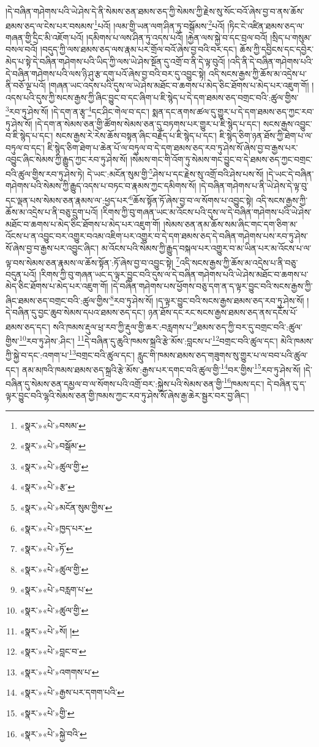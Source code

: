 །དེ་བཞིན་གཤེགས་པའི་ཡེ་ཤེས་དེ་ནི་སེམས་ཅན་ཐམས་ཅད་ཀྱི་སེམས་ཀྱི་རྗེས་སུ་སོང་བའོ་ཞེས་བྱ་བ་ནས་ཆོས་ཐམས་ཅད་ལ་ངེས་པར་བསམས་\footnote{«སྣར་»«པེ་»བསམ་}པའོ། །ལམ་གྱི་ཡན་ལག་ཤིན་ཏུ་བསྒོམས་\footnote{«སྣར་»«པེ་»བསྒོམ་}པའོ། །ཏིང་ངེ་འཛིན་ཐམས་ཅད་ལ་གཞན་གྱི་དྲིང་མི་འཇོག་པའོ། །དམིགས་པ་ལས་ཤིན་ཏུ་འདས་པའོ། །རྐྱེན་ལས་སྐྱེ་བ་དང་བྲལ་བའོ། །སྲིད་པ་གསུམ་བསལ་བའོ། །བདུད་ཀྱི་ལས་ཐམས་ཅད་ལས་རྣམ་པར་གྲོལ་བའོ་ཞེས་བྱ་བའི་བར་དང་། ཆོས་ཀྱི་དབྱིངས་དང་དབྱེར་མེད་པ་སྟེ་དེ་བཞིན་གཤེགས་པའི་ཡིད་ཀྱི་ལས་ཡེ་ཤེས་སྔོན་དུ་འགྲོ་བ་ནི་དེ་ལྟ་བུའོ། །འདི་ནི་དེ་བཞིན་གཤེགས་པའི་དེ་བཞིན་གཤེགས་པའི་ལས་ཉི་ཤུ་རྩ་དགུ་པའོ་ཞེས་བྱ་བའི་བར་དུ་འབྱུང་སྟེ། འདི་སངས་རྒྱས་ཀྱི་ཆོས་མ་འདྲེས་པ་ནི་བཅོ་ལྔ་པའོ། །གཞན་ཡང་འདས་པའི་དུས་ལ་ཡེ་ཤེས་མཐོང་བ་ཆགས་པ་མེད་ཅིང་ཐོགས་པ་མེད་པར་འཇུག་གོ། །འདས་པའི་དུས་ཀྱི་སངས་རྒྱས་ཀྱི་ཞིང་བྱུང་བ་དང་ཞིག་པ་ཇི་སྙེད་པ་དེ་དག་ཐམས་ཅད་བགྲང་བའི་:ཚུལ་གྱིས་\footnote{«སྣར་»«པེ་»ཚུལ་གྱི་}རབ་ཏུ་ཤེས་སོ། །དེ་དག་ན་རྩྭ་\footnote{«སྣར་»«པེ་»རྩ་}དང་ཤིང་གེལ་བ་དང་། སྨན་དང་ནགས་ཚལ་དུ་གྱུར་པ་དེ་དག་ཐམས་ཅད་ཀྱང་རབ་ཏུ་ཤེས་སོ། །དེ་དག་ན་སེམས་ཅན་གྱི་ཚོགས་སེམས་ཅན་དུ་བཏགས་པར་གྱུར་པ་ཇི་སྙེད་པ་དང་། སངས་རྒྱས་འབྱུང་བ་ཇི་སྙེད་པ་དང་། སངས་རྒྱས་རེ་རེས་ཆོས་བསྟན་ཞིང་བརྗོད་པ་ཇི་སྙེད་པ་དང་། ཇི་སྙེད་ཅིག་ཉན་ཐོས་ཀྱི་ཐེག་པ་ལ་བཏུལ་བ་དང་། ཇི་སྙེད་ཅིག་ཐེག་པ་ཆེན་པོ་ལ་བཏུལ་བ་དེ་དག་ཐམས་ཅད་རབ་ཏུ་ཤེས་སོ་ཞེས་བྱ་བ་རྒྱས་པར་འབྱུང་ཞིང་སེམས་ཀྱི་རྒྱུད་ཀྱང་རབ་ཏུ་ཤེས་སོ། །སེམས་གང་གི་འོག་ཏུ་སེམས་གང་བྱུང་བ་དེ་ཐམས་ཅད་ཀྱང་བགྲང་བའི་ཚུལ་གྱིས་རབ་ཏུ་ཤེས་ཏེ། དེ་ཡང་:མངོན་སུམ་གྱི་\footnote{«སྣར་»«པེ་»མངོན་སུམ་གྱིས་}ཤེས་པ་དང་རྗེས་སུ་འགྲོ་བའི་ཤེས་པས་སོ། །དེ་ཡང་དེ་བཞིན་གཤེགས་པའི་སེམས་ཀྱི་རྒྱུད་འདས་པ་བཏང་བ་རྣམས་ཀྱང་དམིགས་སོ། །དེ་བཞིན་གཤེགས་པ་ནི་ཡེ་ཤེས་དེ་ལྟ་བུ་དང་ལྡན་པས་སེམས་ཅན་རྣམས་ལ་:ཕྱད་པར་\footnote{«སྣར་»«པེ་»ཁྱད་པར་}ཆོས་སྟོན་ཏོ་ཞེས་བྱ་བ་ལ་སོགས་པ་འབྱུང་སྟེ། འདི་སངས་རྒྱས་ཀྱི་ཆོས་མ་འདྲེས་པ་ནི་བཅུ་དྲུག་པའོ། །རིགས་ཀྱི་བུ་གཞན་ཡང་མ་འོངས་པའི་དུས་ལ་དེ་བཞིན་གཤེགས་པའི་ཡེ་ཤེས་མཐོང་བ་ཆགས་པ་མེད་ཅིང་ཐོགས་པ་མེད་པར་འཇུག་གོ། །སེམས་ཅན་ནམ་ཆོས་སམ་ཞིང་གང་དག་ཅིག་མ་འོངས་པ་ན་འབྱུང་བར་འགྱུར་བའམ་འཇིག་པར་འགྱུར་བ་དེ་དག་ཐམས་ཅད་དེ་བཞིན་གཤེགས་པས་རབ་ཏུ་ཤེས་སོ་ཞེས་བྱ་བ་རྒྱས་པར་འབྱུང་ཞིང་། མ་འོངས་པའི་སེམས་ཀྱི་རྒྱུད་བསྐལ་པར་འགྱུར་བ་མ་ཡིན་པར་མ་འོངས་པ་ལ་ལྟ་བས་སེམས་ཅན་རྣམས་ལ་ཆོས་སྟོན་:ཏོ་ཞེས་བྱ་བ་འབྱུང་སྟེ། \footnote{«སྣར་»«པེ་»ཏོ་}འདི་སངས་རྒྱས་ཀྱི་ཆོས་མ་འདྲེས་པ་ནི་བཅུ་བདུན་པའོ། །རིགས་ཀྱི་བུ་གཞན་ཡང་ད་ལྟར་བྱུང་བའི་དུས་ལ་དེ་བཞིན་གཤེགས་པའི་ཡེ་ཤེས་མཐོང་བ་ཆགས་པ་མེད་ཅིང་ཐོགས་པ་མེད་པར་འཇུག་གོ། །དེ་བཞིན་གཤེགས་པས་ཕྱོགས་བཅུ་དག་ན་ད་ལྟར་བྱུང་བའི་སངས་རྒྱས་ཀྱི་ཞིང་ཐམས་ཅད་བགྲང་བའི་:ཚུལ་གྱིས་\footnote{«སྣར་»«པེ་»ཚུལ་གྱི་}རབ་ཏུ་ཤེས་སོ། །ད་ལྟར་བྱུང་བའི་སངས་རྒྱས་ཐམས་ཅད་རབ་ཏུ་ཤེས་སོ། །དེ་བཞིན་དུ་བྱང་ཆུབ་སེམས་དཔའ་ཐམས་ཅད་དང་། ཉན་ཐོས་དང་རང་སངས་རྒྱས་ཐམས་ཅད་ནས་དངོས་པོ་ཐམས་ཅད་དང་། སའི་ཁམས་རྡུལ་ཕྲ་རབ་ཀྱི་རྡུལ་གྱི་ཆར་:བརླགས་པ་\footnote{«སྣར་»«པེ་»བརླག་པ་}ཐམས་ཅད་ཀྱི་བར་དུ་བགྲང་བའི་:ཚུལ་གྱིས་\footnote{«སྣར་»«པེ་»ཚུལ་གྱི་}རབ་ཏུ་ཤེས་:ཤིང་། \footnote{«སྣར་»«པེ་»སོ། ། }དེ་བཞིན་དུ་ཆུའི་ཁམས་སྐྲའི་རྩེ་མོས་:བླངས་པ་\footnote{«སྣར་»«པེ་»བླང་བ་}བགྲང་བའི་ཚུལ་དང་། མེའི་ཁམས་ཀྱི་སྐྱེ་བ་དང་:འགག་པ་\footnote{«སྣར་»«པེ་»འགགས་པ་}བགྲང་བའི་ཚུལ་དང་། རླུང་གི་ཁམས་ཐམས་ཅད་གཟུགས་སུ་གྱུར་པ་ལ་བབ་པའི་ཚུལ་དང་། ནམ་མཁའི་ཁམས་ཐམས་ཅད་སྐྲའི་རྩེ་མོས་:རྒྱས་པར་དགང་བའི་ཚུལ་གྱི་\footnote{«སྣར་»«པེ་»རྒྱས་པར་དགག་པའི་}བར་གྱིས་\footnote{«སྣར་»«པེ་»གྱི་}རབ་ཏུ་ཤེས་སོ། །དེ་བཞིན་དུ་སེམས་ཅན་དམྱལ་བ་ལ་སོགས་པའི་འགྲོ་བར་:སྐྱེས་པའི་སེམས་ཅན་གྱི་\footnote{«སྣར་»«པེ་»སྐྱེ་བའི་}ཁམས་དང་། དེ་བཞིན་དུ་ད་ལྟར་བྱུང་བའི་ལྷའི་སེམས་ཅན་གྱི་ཁམས་ཀྱང་རབ་ཏུ་ཤེས་སོ་ཞེས་རྒྱ་ཆེར་སྦྱར་བར་བྱ་ཞིང་། 